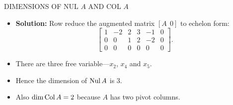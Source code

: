 \begin{frame}[shrink=8]{DIMENSIONS OF NUL $A$ AND COL $A$}
\begin{itemize}
\item \textbf{Solution:} Row reduce the augmented matrix $[A\ \ 0]$ to echelon form:
\[
\begin{bmatrix}
1&-2&2&3&-1&0\\
0&0&1&2&-2&0\\
0&0&0&0&0&0
\end{bmatrix}.
\]
\item There are three free variable---$x_2$, $x_4$ and $x_5$.
\item Hence the dimension of $\operatorname{Nul} A$ is 3.
\item Also $\dim\operatorname{Col} A=2$ because $A$ has two pivot columns.
\end{itemize}
\end{frame}
